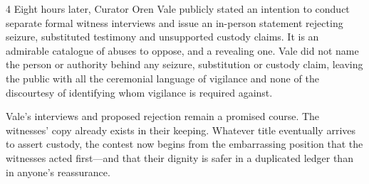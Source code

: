 \documentclass{article}
\begin{document}
\begin{multicols}{4}
Eight hours later, Curator Oren Vale publicly stated an intention to conduct separate formal witness interviews and issue an in-person statement rejecting seizure, substituted testimony and unsupported custody claims. It is an admirable catalogue of abuses to oppose, and a revealing one. Vale did not name the person or authority behind any seizure, substitution or custody claim, leaving the public with all the ceremonial language of vigilance and none of the discourtesy of identifying whom vigilance is required against.

Vale’s interviews and proposed rejection remain a promised course. The witnesses’ copy already exists in their keeping. Whatever title eventually arrives to assert custody, the contest now begins from the embarrassing position that the witnesses acted first—and that their dignity is safer in a duplicated ledger than in anyone’s reassurance.
\end{multicols}
\vfill\begin{center}\fleuron\end{center}
\end{document}
